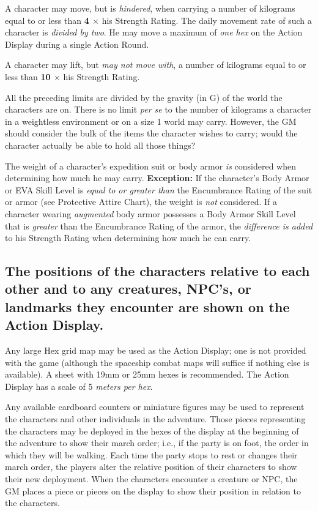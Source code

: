 A character may move, but is \emph{hindered}, when carrying a number
of kilograms equal to or less than \textbf{4 $\times$} his Strength
Rating. The daily movement rate of such a character is \emph{divided
  by two}. He may move a maximum of \emph{one hex} on the Action
Display during a single Action Round.

A character may lift, but \emph{may not move with}, a number of kilograms
equal to or less than \textbf{10 $\times$} his Strength Rating.

All the preceding limits are divided by the gravity (in G) of the
world the characters are on. There is no limit \emph{per se} to the number of
kilograms a character in a weightless environment or on a size 1 world
may carry. However, the GM should consider the bulk of the items the
character wishes to carry; would the character actually be able to
hold all those things?

The weight of a character's expedition suit or body armor \emph{is}
considered when determining how much he may carry. \textbf{Exception:}
If the character's Body Armor or EVA Skill Level is \emph{equal to or
  greater than} the Encumbrance Rating of the suit or armor (see
Protective Attire Chart), the weight is \emph{not} considered. If a
character wearing \emph{augmented} body armor possesses a Body Armor
Skill Level that is \emph{greater} than the Encumbrance Rating of the
armor, the \emph{difference is added} to his Strength Rating when
determining how much he can carry.



\subsection[Action Display]{The positions of the characters relative
  to each other and to any creatures, NPC's, or landmarks they
  encounter are shown on the Action Display.} 
\label{sec:action-display}



Any large Hex grid map may be used as the Action Display; one is not
provided with the game (although the spaceship combat maps will
suffice if nothing else is available). A sheet with 19mm or 25mm hexes
is recommended. The Action Display has a scale of 5 \emph{meters per hex}.

Any available cardboard counters or miniature figures may be used to
represent the characters and other individuals in the adventure.
Those pieces representing the characters may be deployed in the hexes
of the display at the beginning of the adventure to show their march
order; i.e., if the party is on foot, the order in which they will be
walking. Each time the party stops to rest or changes their march
order, the players alter the relative position of their characters to
show their new deployment. When the characters encounter a creature or
NPC, the GM places a piece or pieces on the display to show their
position in relation to the characters.

